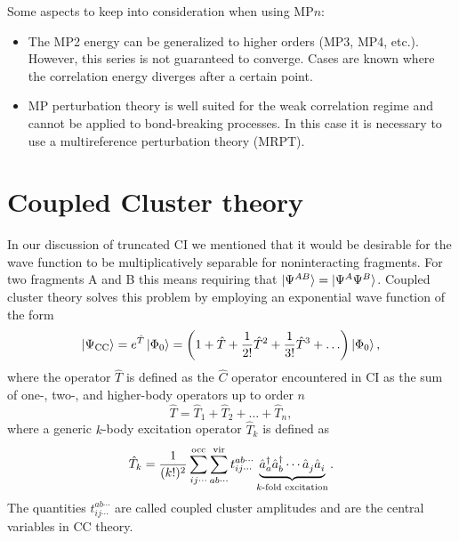 \documentclass[../Main/chem532-notes.tex]{subfiles}
\begin{document}
Some aspects to keep into consideration when using MP$n$:
\begin{itemize}
\item The MP2 energy can be generalized to higher orders (MP3, MP4, etc.). However, this series is not guaranteed to converge. Cases are known where the correlation energy diverges after a certain point.
\item MP perturbation theory is well suited for the weak correlation regime and cannot be applied to bond-breaking processes. In this case it is necessary to use a multireference perturbation theory (MRPT).
\end{itemize}

\section{Coupled Cluster theory}
In our discussion of truncated CI we mentioned that it would be desirable for the wave function to be multiplicatively separable for noninteracting fragments. For two fragments A and B this means requiring that $\ket{\Psi^{AB}} = \ket{\Psi^A\Psi^B}$.
Coupled cluster theory solves this problem by employing an exponential wave function of the form
\begin{equation}
\ket{\Psi_{\mathrm{CC}}} = e^{\hat{T}} \ket{\Phi_0}
= \left(1 + \hat{T} + \frac{1}{2!}\hat{T}^2+ \frac{1}{3!}\hat{T}^3 + \ldots \right)\ket{\Phi_0},
\end{equation}
where the operator $\hat{T}$ is defined as the $\hat{C}$ operator encountered in CI as the sum of one-, two-, and higher-body operators up to order $n$
\begin{equation}
\hat{T} = \hat{T}_1 + \hat{T}_2 + \ldots + \hat{T}_n,
\end{equation}
where a generic $k$-body excitation operator $\hat{T}_k$ is defined as
\begin{equation}
 \hat{T}_k = \frac{1}{(k!)^2} \sum_{ij\cdots}^{\mathrm{occ}} \sum_{ab\cdots}^{\mathrm{vir}} t_{ij\cdots}^{ab\cdots} \underbrace{\hat{a}_{a}^{\dagger} \hat{a}_{b}^{\dagger} \cdots \hat{a}_{j}^{\,} \hat{a}_{i}^{\,}}_{k\text{-fold excitation}}.
\end{equation}
The quantities $t_{ij\cdots}^{ab\cdots}$ are called coupled cluster amplitudes and are the central variables in CC theory.
\end{document}

